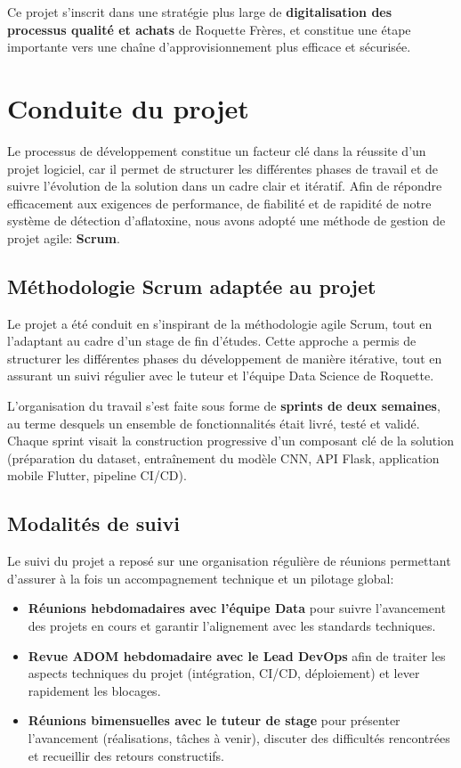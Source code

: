 \documentclass[12pt,a4paper]{report}
\begin{document}
Ce projet s’inscrit dans une stratégie plus large de \textbf{digitalisation des processus qualité et achats} de Roquette Frères, et constitue une étape importante vers une chaîne d’approvisionnement plus efficace et sécurisée.

\cleardoublepage
\section{Conduite du projet}

Le processus de développement constitue un facteur clé dans la réussite d’un projet logiciel, car il permet de structurer les différentes phases de travail et de suivre l’évolution de la solution dans un cadre clair et itératif. Afin de répondre efficacement aux exigences de performance, de fiabilité et de rapidité de notre système de détection d’aflatoxine, nous avons adopté une méthode de gestion de projet agile: \textbf{Scrum}.

\subsection{Méthodologie Scrum adaptée au projet}

Le projet a été conduit en s’inspirant de la méthodologie agile Scrum, tout en l’adaptant au cadre d’un stage de fin d’études. Cette approche a permis de structurer les différentes phases du développement de manière itérative, tout en assurant un suivi régulier avec le tuteur et l’équipe Data Science de Roquette.

L’organisation du travail s’est faite sous forme de \textbf{sprints de deux semaines}, au terme desquels un ensemble de fonctionnalités était livré, testé et validé. Chaque sprint visait la construction progressive d’un composant clé de la solution (préparation du dataset, entraînement du modèle CNN, API Flask, application mobile Flutter, pipeline CI/CD).

\subsection{Modalités de suivi}
Le suivi du projet a reposé sur une organisation régulière de réunions permettant d’assurer à la fois un accompagnement technique et un pilotage global:

\begin{itemize}
    \item \textbf{Réunions hebdomadaires avec l’équipe Data} pour suivre l’avancement des projets en cours et garantir l’alignement avec les standards techniques.
    \item \textbf{Revue ADOM hebdomadaire avec le Lead DevOps} afin de traiter les aspects techniques du projet (intégration, CI/CD, déploiement) et lever rapidement les blocages.
    \item \textbf{Réunions bimensuelles avec le tuteur de stage} pour présenter l’avancement (réalisations, tâches à venir), discuter des difficultés rencontrées et recueillir des retours constructifs.

\end{itemize}
\end{document}
